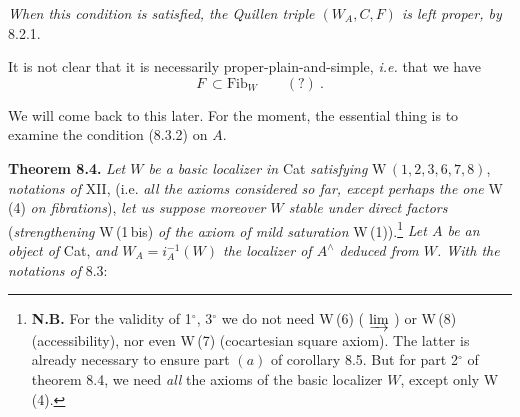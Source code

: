 \documentclass[11pt]{article}
\newcommand{\printedpage}[1]{\marginpar{\footnotesize p.~#1}}
\newcommand{\msp}[1]{\marginpar{\footnotesize [#1]}}
\newcommand{\Fib}{\mathrm{Fib}}
\newcommand{\chap}{^{\wedge}}
\begin{document}
\textit{When this condition is satisfied, the Quillen triple $(W_A,C,F)$ is left proper, by} 8.2.1.

It is not clear that it is necessarily proper-plain-and-simple, \textit{i.e.} that we have
\[
F\ \subset \Fib_W \qquad (?)\ .
\tag*{(8.3.3)}
\]

We will come back to this later. For the moment, the essential thing is to examine the condition (8.3.2) on $A$.

\printedpage{58}
\msp{page 105}
\textbf{Theorem 8.4.} \textit{Let $W$ be a basic localizer in} Cat \textit{satisfying} $\mathrm{W}\,(1,2,3,6,7,8)$, \textit{notations of} XII, (i.e. \textit{all the axioms considered so far, except perhaps the one} W\,(4) \textit{on fibrations}), \textit{let us suppose moreover $W$ stable under direct factors} (\textit{strengthening} W\,(1\,bis) \textit{of the axiom of mild saturation} W\,(1)).\footnote[37]{\textbf{N.B.} For the validity of 1$^\circ$, 3$^\circ$ we do not need W\,(6) ( $\varinjlim$ ) or W\,(8) (accessibility), nor even W\,(7) (cocartesian square axiom). The latter is already necessary to ensure part $(a)$ of corollary 8.5. But for part 2$^\circ$ of theorem 8.4, we need \textit{all} the axioms of the basic localizer $W$, except only W\,(4).} \textit{Let $A$ be an object of} Cat, \textit{and $W_A=i_A^{-1}(W)$ the localizer of $A\chap$ deduced from $W$. With the notations of} 8.3:
\end{document}
